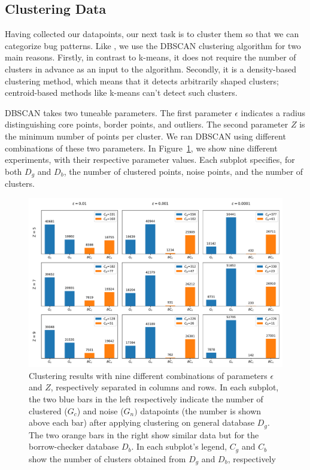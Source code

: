 \subsection{\label{sec:clustering_data}Clustering Data}
\label{sec:clustering}

Having collected our datapoints, our next task is to cluster them so that we can categorize bug patterns. Like \cite{hanam2016discovering}, we use the DBSCAN clustering algorithm for two main reasons. Firstly, in contrast to k-means, it does not require the number of clusters in advance as an input to the algorithm. Secondly, it is a density-based clustering method, which means that it detects arbitrarily shaped clusters; centroid-based methods like k-means can't detect such clusters.

DBSCAN takes two tuneable parameters. The first parameter $\epsilon$ indicates a radius distinguishing core points, border points, and outliers. The second parameter $Z$ is the minimum number of points per cluster. We ran DBSCAN using different combinations of these two parameters. In Figure~\ref{fig:clustering}, we show nine different experiments, with their respective parameter values. Each subplot specifies, for both $D_g$ and $D_b$, the number of clustered points, noise points, and the number of clusters.

\begin{figure}[h]
\centering
\includegraphics[width=1\textwidth]{clusters.pdf}
\caption{\label{fig:clustering} Clustering results with nine different combinations of parameters $\epsilon$ and $Z$, respectively separated in columns and rows. In each subplot, the two blue bars in the left respectively indicate the number of clustered ($G_c$) and noise ($G_n)$ datapoints (the number is shown above each bar) after applying clustering on general database $D_g$. The two orange bars in the right show similar data but for the borrow-checker database $D_{b}$. In each subplot's legend, $C_g$ and $C_b$ show the number of clusters obtained from $D_g$ and $D_b$, respectively}
\end{figure}

